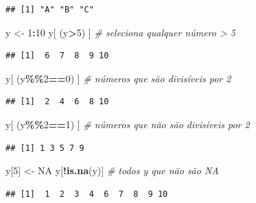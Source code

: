 \documentclass[
]{book}
\newenvironment{Shaded}{\begin{snugshade}}{\end{snugshade}}
\newcommand{\CommentTok}[1]{\textcolor[rgb]{0.56,0.35,0.01}{\textit{#1}}}
\newcommand{\ConstantTok}[1]{\textcolor[rgb]{0.56,0.35,0.01}{#1}}
\newcommand{\DecValTok}[1]{\textcolor[rgb]{0.00,0.00,0.81}{#1}}
\newcommand{\FunctionTok}[1]{\textcolor[rgb]{0.13,0.29,0.53}{\textbf{#1}}}
\newcommand{\NormalTok}[1]{#1}
\newcommand{\OtherTok}[1]{\textcolor[rgb]{0.56,0.35,0.01}{#1}}
\newcommand{\SpecialCharTok}[1]{\textcolor[rgb]{0.81,0.36,0.00}{\textbf{#1}}}
\theoremstyle{definition}
\theoremstyle{definition}
\theoremstyle{definition}
\theoremstyle{definition}
\theoremstyle{remark}
\begin{document}
\begin{verbatim}
## [1] "A" "B" "C"
\end{verbatim}

\begin{Shaded}
\begin{Highlighting}[]
\NormalTok{y }\OtherTok{\textless{}{-}} \DecValTok{1}\SpecialCharTok{:}\DecValTok{10}
\NormalTok{y[ (y}\SpecialCharTok{\textgreater{}}\DecValTok{5}\NormalTok{) ] }\CommentTok{\# seleciona qualquer número \textgreater{} 5}
\end{Highlighting}
\end{Shaded}

\begin{verbatim}
## [1]  6  7  8  9 10
\end{verbatim}

\begin{Shaded}
\begin{Highlighting}[]
\NormalTok{y[ (y}\SpecialCharTok{\%\%}\DecValTok{2}\SpecialCharTok{==}\DecValTok{0}\NormalTok{) ] }\CommentTok{\# números que são divisíveis por 2}
\end{Highlighting}
\end{Shaded}

\begin{verbatim}
## [1]  2  4  6  8 10
\end{verbatim}

\begin{Shaded}
\begin{Highlighting}[]
\NormalTok{y[ (y}\SpecialCharTok{\%\%}\DecValTok{2}\SpecialCharTok{==}\DecValTok{1}\NormalTok{) ] }\CommentTok{\# números que não são divisíveis por 2}
\end{Highlighting}
\end{Shaded}

\begin{verbatim}
## [1] 1 3 5 7 9
\end{verbatim}

\begin{Shaded}
\begin{Highlighting}[]
\NormalTok{y[}\DecValTok{5}\NormalTok{] }\OtherTok{\textless{}{-}} \ConstantTok{NA}
\NormalTok{y[}\SpecialCharTok{!}\FunctionTok{is.na}\NormalTok{(y)] }\CommentTok{\# todos y que não são NA }
\end{Highlighting}
\end{Shaded}

\begin{verbatim}
## [1]  1  2  3  4  6  7  8  9 10
\end{verbatim}
\end{document}
